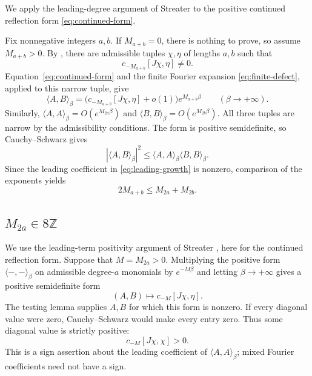 \documentclass[11pt, letterpaper, reqno]{amsart}
\theoremstyle{definition}
\theoremstyle{remark}
\newcommand{\bbZ}{\mathbb{Z}}
\begin{document}
We apply the leading-degree argument of Streater
\cite[Lemma~2, pp.~113--114]{Streater} to the positive continued
reflection form \eqref{eq:continued-form}.

Fix nonnegative integers $a,b$. If $M_{a+b}=0$, there is nothing to
prove, so assume $M_{a+b}>0$. By , there are
admissible tuples $\chi,\eta$ of lengths $a,b$ such that
\begin{equation}
 c_{-M_{a+b}}[J\chi,\eta]\neq0.
\end{equation}
Equation~\eqref{eq:continued-form} and the finite Fourier expansion
\eqref{eq:finite-defect}, applied to this narrow tuple, give
\begin{equation}\label{eq:leading-growth}
 \langle A,B\rangle_\beta
   =\bigl(c_{-M_{a+b}}[J\chi,\eta]+o(1)\bigr)
                  e^{M_{a+b}\beta}\qquad(\beta\to+\infty).
\end{equation}
Similarly,
$\langle A,A\rangle_\beta=O(e^{M_{2a}\beta})$ and
$\langle B,B\rangle_\beta=O(e^{M_{2b}\beta})$.
All three tuples are narrow by the admissibility conditions.
The form is positive semidefinite, so Cauchy--Schwarz gives
\begin{equation}\label{eq:ext_CS}
 |\langle A,B\rangle_\beta|^2
       \leq\langle A,A\rangle_\beta\langle B,B\rangle_\beta.
\end{equation}
Since the leading coefficient in \eqref{eq:leading-growth} is nonzero,
comparison of the exponents yields
\begin{equation}\label{eq:convexity}
 2M_{a+b}\leq M_{2a}+M_{2b}.
\end{equation}

\subsection{$M_{2a}\in8\bbZ$}

We use the leading-term positivity argument of Streater
\cite[\S6, especially the proof of Lemma~8]{Streater}, here for the
continued reflection form.
Suppose that $M=M_{2a}>0$. Multiplying the positive form
$\langle-,-\rangle_\beta$ on admissible degree-$a$ monomials by $e^{-M\beta}$
and letting $\beta\to+\infty$ gives a positive semidefinite form
\begin{equation}
 (A,B)\longmapsto c_{-M}[J\chi,\eta].
\end{equation}
The testing lemma supplies $A,B$ for which this form is nonzero.
If every diagonal value were zero, Cauchy--Schwarz would make every
entry zero. Thus some diagonal value is strictly positive:
\begin{equation}\label{eq:c_pos}
 c_{-M}[J\chi,\chi]>0.
\end{equation}
This is a sign assertion about the leading coefficient of
$\langle A,A\rangle_\beta$; mixed Fourier coefficients need not have a sign.
\end{document}
